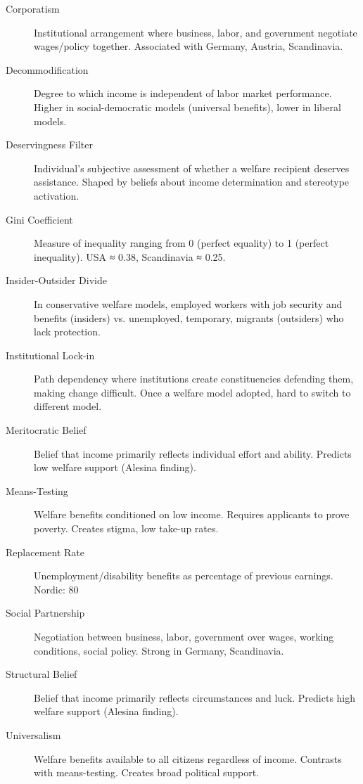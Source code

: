 \begin{description}

\item[Corporatism] Institutional arrangement where business, labor, and government negotiate wages/policy together. Associated with Germany, Austria, Scandinavia.

\item[Decommodification] Degree to which income is independent of labor market performance. Higher in social-democratic models (universal benefits), lower in liberal models.

\item[Deservingness Filter] Individual's subjective assessment of whether a welfare recipient deserves assistance. Shaped by beliefs about income determination and stereotype activation.

\item[Gini Coefficient] Measure of inequality ranging from 0 (perfect equality) to 1 (perfect inequality). USA ≈ 0.38, Scandinavia ≈ 0.25.

\item[Insider-Outsider Divide] In conservative welfare models, employed workers with job security and benefits (insiders) vs. unemployed, temporary, migrants (outsiders) who lack protection.

\item[Institutional Lock-in] Path dependency where institutions create constituencies defending them, making change difficult. Once a welfare model adopted, hard to switch to different model.

\item[Meritocratic Belief] Belief that income primarily reflects individual effort and ability. Predicts low welfare support (Alesina finding).

\item[Means-Testing] Welfare benefits conditioned on low income. Requires applicants to prove poverty. Creates stigma, low take-up rates.

\item[Replacement Rate] Unemployment/disability benefits as percentage of previous earnings. Nordic: 80%

\item[Social Partnership] Negotiation between business, labor, government over wages, working conditions, social policy. Strong in Germany, Scandinavia.

\item[Structural Belief] Belief that income primarily reflects circumstances and luck. Predicts high welfare support (Alesina finding).

\item[Universalism] Welfare benefits available to all citizens regardless of income. Contrasts with means-testing. Creates broad political support.

\end{description}

